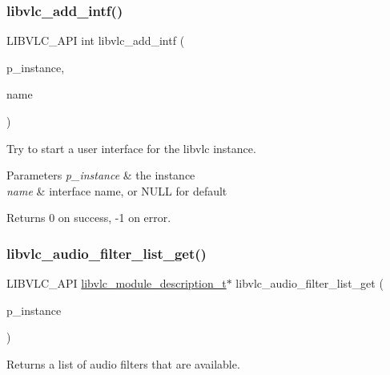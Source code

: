 \subsubsection{\texorpdfstring{libvlc\+\_\+add\+\_\+intf()}{libvlc\_add\_intf()}}
{\footnotesize\ttfamily L\+I\+B\+V\+L\+C\+\_\+\+A\+PI int libvlc\+\_\+add\+\_\+intf (\begin{DoxyParamCaption}\item[{\hyperlink{group__libvlc__core_ga316d739a80da4678206c79f4d6c2e284}{libvlc\+\_\+instance\+\_\+t} $\ast$}]{p\+\_\+instance,  }\item[{const char $\ast$}]{name }\end{DoxyParamCaption})}

Try to start a user interface for the libvlc instance.


\begin{DoxyParams}{Parameters}
{\em p\+\_\+instance} & the instance \\
\hline
{\em name} & interface name, or N\+U\+LL for default \\
\hline
\end{DoxyParams}
\begin{DoxyReturn}{Returns}
0 on success, -\/1 on error. 
\end{DoxyReturn}
\mbox{\label{group__libvlc__core_ga2a9b8d8c7282b7602aa6a9ea4550cf18}} 
\subsubsection{\texorpdfstring{libvlc\+\_\+audio\+\_\+filter\+\_\+list\+\_\+get()}{libvlc\_audio\_filter\_list\_get()}}
{\footnotesize\ttfamily L\+I\+B\+V\+L\+C\+\_\+\+A\+PI \hyperlink{structlibvlc__module__description__t}{libvlc\+\_\+module\+\_\+description\+\_\+t}$\ast$ libvlc\+\_\+audio\+\_\+filter\+\_\+list\+\_\+get (\begin{DoxyParamCaption}\item[{\hyperlink{group__libvlc__core_ga316d739a80da4678206c79f4d6c2e284}{libvlc\+\_\+instance\+\_\+t} $\ast$}]{p\+\_\+instance }\end{DoxyParamCaption})}

Returns a list of audio filters that are available.


